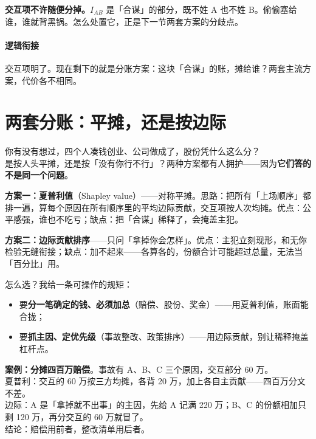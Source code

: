 \documentclass[../../main2.tex]{subfiles}
\begin{document}

\begin{warningbox}
	\textbf{交互项不许随便分掉。}$I_{AB}$ 是「合谋」的部分，既不姓 A 也不姓 B。偷偷塞给谁，谁就背黑锅。怎么处置它，正是下一节两套方案的分歧点。
\end{warningbox}

\paragraph*{逻辑衔接}
	交互项明了。现在剩下的就是分账方案：这块「合谋」的账，摊给谁？两套主流方案，代价各不相同。

\section{两套分账：平摊，还是按边际}

\begin{readingnote}
	你有没有想过，四个人凑钱创业、公司做成了，股份凭什么这么分？\\
	是按人头平摊，还是按「没有你行不行」？两种方案都有人拥护——因为\textbf{它们答的不是同一个问题}。
\end{readingnote}

\textbf{方案一：夏普利值}（Shapley value）——对称平摊。思路：把所有「上场顺序」都排一遍，算每个原因在所有顺序里的平均边际贡献，交互项按人次均摊。优点：公平感强，谁也不吃亏；缺点：把「合谋」稀释了，会掩盖主犯。

\textbf{方案二：边际贡献排序}——只问「拿掉你会怎样」。优点：主犯立刻现形，和无你检验无缝衔接；缺点：加不起来——各算各的，份额合计可能超过总量，无法当「百分比」用。

怎么选？我给一条可操作的规矩：

\begin{itemize}
	\item 要\textbf{分一笔确定的钱、必须加总}（赔偿、股份、奖金）——用夏普利值，账面能合拢；
	\item 要\textbf{抓主因、定优先级}（事故整改、政策排序）——用边际贡献，别让稀释掩盖杠杆点。
\end{itemize}

\begin{examplebox}
	\textbf{案例：分摊四百万赔偿}。事故有 A、B、C 三个原因，交互部分 60 万。\\
	夏普利：交互的 60 万按三方均摊，各背 20 万，加上各自主贡献——四百万分文不差。\\
	边际：A 是「拿掉就不出事」的主因，先给 A 记满 220 万；B、C 的份额相加只剩 120 万，再分交互的 60 万就冒了。\\
	结论：赔偿用前者，整改清单用后者。\end{examplebox}
\end{document}
